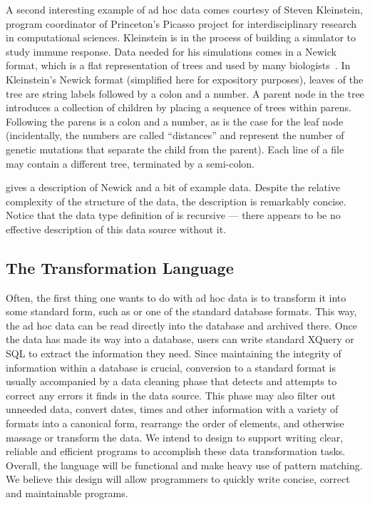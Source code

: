 \documentclass[11pt]{article}
\begin{document}
A second interesting example of ad hoc data comes courtesy of
Steven Kleinstein, program coordinator of Princeton's Picasso project for
interdisciplinary research in computational sciences.  
Kleinstein is in the process of 
building a simulator to study immune response.  Data
needed for his simulations comes in a Newick format, which is
a flat representation of trees and used by many biologists~\cite{newick}.  
In Kleinstein's Newick format (simplified
here for expository purposes), leaves of the
tree are string labels followed by a colon and a number.
A parent node in the tree introduces a collection of
children by placing a sequence of trees within parens.
Following the parens is a colon and a number, as is the case
for the leaf node (incidentally, the numbers are called ``distances''
and represent the number of genetic mutations that separate the
child from the parent).  Each line of a file may contain
a different tree, terminated by a semi-colon.

 gives a description of Newick
and a bit of example data.
Despite the relative complexity of the structure of the data, 
the description is remarkably concise.
Notice that the data type definition of  is recursive ---
there appears to be no effective description of this data
source without it.  

\subsection{The \datatype{} Transformation Language}
\label{sec:language}

Often, the first thing one wants to do with ad hoc data 
is to transform it into some standard form, such as \xml{}
or one of the standard database formats.  This way,
the ad hoc data can be read directly into the database
and archived there.  Once the data has made its way into a database, 
users can write standard XQuery or SQL to extract the information 
they need.  Since maintaining the integrity of information
within a database is crucial, conversion to a standard format
is usually accompanied by a data cleaning phase that detects
and attempts to correct any errors it finds in the data source.
This phase may also filter out unneeded data, convert dates,
times and other information with a variety of formats into
a canonical form, rearrange the order of elements,
and otherwise massage or transform the data.
We intend to design \datatype{} 
to support writing clear, reliable and efficient programs to
accomplish these data transformation tasks.
Overall, the language will be functional and make
heavy use of pattern matching.  We believe this design will
allow programmers to quickly write concise, correct and maintainable
programs.  
\end{document}
